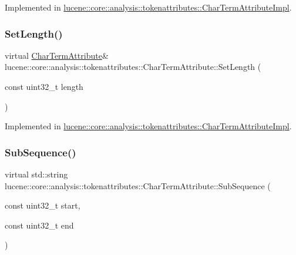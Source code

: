 Implemented in \mbox{\hyperlink{classlucene_1_1core_1_1analysis_1_1tokenattributes_1_1CharTermAttributeImpl_a328d66d5bfd40a9bcd91ffe59933bc15}{lucene\+::core\+::analysis\+::tokenattributes\+::\+Char\+Term\+Attribute\+Impl}}.

\mbox{\label{classlucene_1_1core_1_1analysis_1_1tokenattributes_1_1CharTermAttribute_a8186262029561e196e991fc543cd9953}} 
\subsubsection{\texorpdfstring{Set\+Length()}{SetLength()}}
{\footnotesize\ttfamily virtual \mbox{\hyperlink{classlucene_1_1core_1_1analysis_1_1tokenattributes_1_1CharTermAttribute}{Char\+Term\+Attribute}}\& lucene\+::core\+::analysis\+::tokenattributes\+::\+Char\+Term\+Attribute\+::\+Set\+Length (\begin{DoxyParamCaption}\item[{const uint32\+\_\+t}]{length }\end{DoxyParamCaption})\hspace{0.3cm}{\ttfamily [pure virtual]}}



Implemented in \mbox{\hyperlink{classlucene_1_1core_1_1analysis_1_1tokenattributes_1_1CharTermAttributeImpl_a752c93bfaa290094349858306468c9a9}{lucene\+::core\+::analysis\+::tokenattributes\+::\+Char\+Term\+Attribute\+Impl}}.

\mbox{\label{classlucene_1_1core_1_1analysis_1_1tokenattributes_1_1CharTermAttribute_af97534d3a549afbbddd5f64b97efc5a4}} 
\subsubsection{\texorpdfstring{Sub\+Sequence()}{SubSequence()}}
{\footnotesize\ttfamily virtual std\+::string lucene\+::core\+::analysis\+::tokenattributes\+::\+Char\+Term\+Attribute\+::\+Sub\+Sequence (\begin{DoxyParamCaption}\item[{const uint32\+\_\+t}]{start,  }\item[{const uint32\+\_\+t}]{end }\end{DoxyParamCaption})\hspace{0.3cm}{\ttfamily [pure virtual]}}




